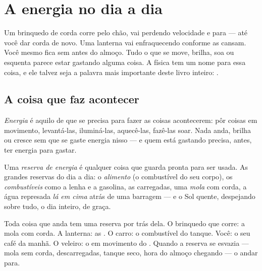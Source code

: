 \chapter{A energia no dia a dia}\label{ch:g5:everyday-energy}

Um brinquedo de corda corre pelo chão, vai perdendo velocidade e
para --- até você dar corda de novo. Uma lanterna vai enfraquecendo
conforme as  cansam. Você mesmo fica sem  antes do almoço.
Tudo o que se move, brilha, soa ou esquenta parece estar gastando
alguma coisa. A física tem um nome para essa coisa, e ele talvez seja
a palavra mais importante deste livro inteiro: .

\section{A coisa que faz acontecer}

\begin{definition}[Energia]\label{def:g5:everyday-energy:energy}
\emph{Energia} é aquilo de que se precisa para fazer
as coisas acontecerem: pôr coisas em movimento, levantá-las,
iluminá-las, aquecê-las, fazê-las soar. Nada anda, brilha ou cresce
sem que se gaste energia nisso --- e quem está gastando precisa,
antes, ter energia para gastar.
\end{definition}

\begin{definition}\label{def:g5:everyday-energy:store}
Uma \emph{reserva de energia} é qualquer
coisa que guarda  pronta para ser usada. As grandes reservas
do dia a dia: o \emph{alimento} (o combustível do seu corpo), os
\emph{combustíveis} como a lenha e a gasolina, as \emph{}
carregadas, uma \emph{mola} com corda, a água represada \emph{lá em
cima} atrás de uma barragem --- e o Sol quente, despejando 
sobre tudo, o dia inteiro, de graça.
\end{definition}

\begin{example}\label{ex:g5:everyday-energy:spot}
Toda coisa que anda tem uma reserva por trás dela. O brinquedo que
corre: a mola com corda. A lanterna: as . O carro: o
combustível do tanque. Você: o seu café da manhã. O veleiro: o  em
movimento do . Quando a reserva se esvazia --- mola sem corda,
 descarregadas, tanque seco, hora do almoço chegando --- o
andar para.
\end{example}

